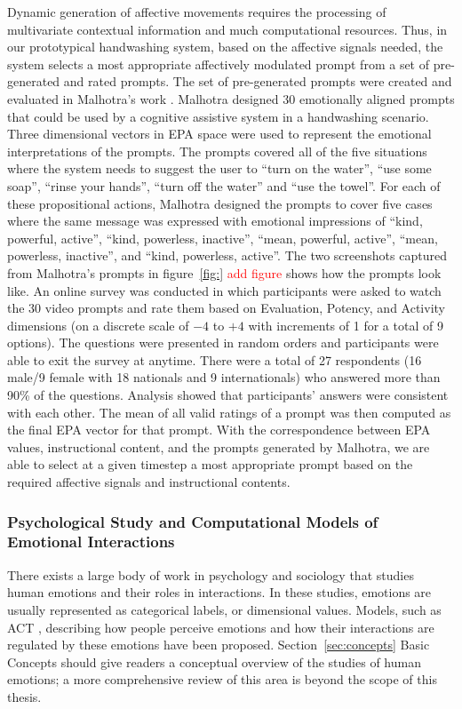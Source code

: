 Dynamic generation of affective movements requires the processing of multivariate contextual information and much computational resources. Thus, in our prototypical handwashing system, based on the affective signals needed, the system selects a most appropriate affectively modulated prompt from a set of pre-generated and rated prompts. The set of pre-generated prompts were created and evaluated in Malhotra's work \cite{malhotra2014}.  Malhotra designed 30 emotionally aligned prompts that could be used by a cognitive assistive system in a handwashing scenario. Three dimensional vectors in EPA space were used to represent the emotional interpretations of the prompts. The prompts covered all of the five situations where the system needs to suggest the user to ``turn on the water'', ``use some soap'', ``rinse your hands'', ``turn off the water'' and ``use the towel''. For each of these propositional actions, Malhotra designed the prompts to cover five cases where the same message was expressed with emotional impressions of ``kind, powerful, active'', ``kind, powerless, inactive'', ``mean, powerful, active'', ``mean, powerless, inactive'', and ``kind, powerless, active''. The two screenshots captured from Malhotra's prompts in figure~\ref{fig:} \textcolor{red}{add figure} shows how the prompts look like. An online survey was conducted in which participants were asked to watch the 30 video prompts and rate them based on Evaluation, Potency, and Activity dimensions (on a discrete scale of $-4$ to $+4$ with increments of 1 for a total of 9 options). The questions were presented in random orders and participants were able to exit the survey at anytime. There were a total of 27 respondents (16 male/9 female with 18 nationals and 9 internationals) who answered more than 90\% of the questions. Analysis showed that participants' answers were consistent with each other. The mean of all valid ratings of a prompt was then computed as the final EPA vector for that prompt. With the correspondence between EPA values, instructional content, and the prompts generated by Malhotra, we are able to select at a given timestep a most appropriate prompt based on the required affective signals and instructional contents.

\subsubsection{Psychological Study and Computational Models of Emotional Interactions}

There exists a large body of work in psychology and sociology that studies human emotions and their roles in interactions. In these studies, emotions are usually represented as categorical labels, or dimensional values. Models, such as ACT \cite{robinson2006affect}, describing how people perceive emotions and how their interactions are regulated by these emotions have been proposed. Section~\ref{sec:concepts} Basic Concepts should give readers a conceptual overview of the studies of human emotions; a more comprehensive review of this area is beyond the scope of this thesis.

